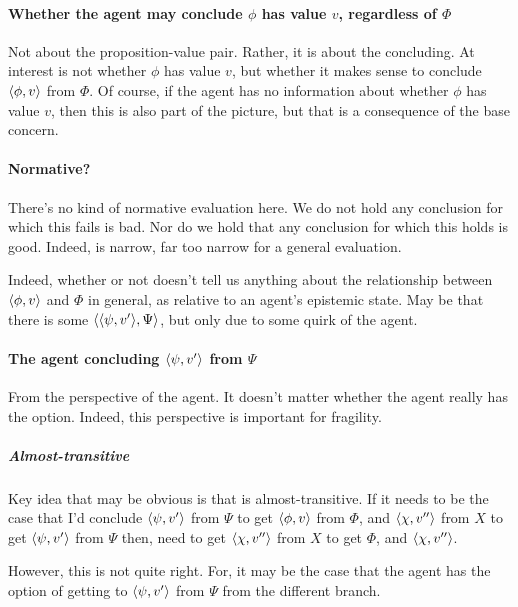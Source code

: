 \paragraph*{Whether the agent may conclude \(\phi\) has value \(v\), regardless of \(\Phi\)}

\begin{note}
  Not about the proposition-value pair.
  Rather, it is about the concluding.
  At interest is not whether \(\phi\) has value \(v\), but whether it makes sense to conclude \(\langle \phi, v \rangle\) from \(\Phi\).
  Of course, if the agent has no information about whether \(\phi\) has value \(v\), then this is also part of the picture, but that is a consequence of the base concern.
\end{note}

\paragraph*{Normative?}

\begin{note}
  There's no kind of normative evaluation here.
  We do not hold any conclusion for which this fails is bad.
  Nor do we hold that any conclusion for which this holds is good.
  Indeed, \zs{} is narrow, far too narrow for a general evaluation.

  Indeed, whether or not \zs{} doesn't tell us anything about the relationship between \(\langle \phi, v \rangle\) and \(\Phi\) in general, as relative to an agent's epistemic state.
  May be that there is some \(\langle \langle \psi, v' \rangle, \Psi \rangle\), but only due to some quirk of the agent.
\end{note}

\paragraph*{The agent concluding \(\langle \psi, v' \rangle\) from \(\Psi\)}

\begin{note}
  From the perspective of the agent.
  It doesn't matter whether the agent really has the option.
  Indeed, this perspective is important for fragility.
\end{note}

\subparagraph*{Almost-transitive}

\begin{note}
  Key idea that may be obvious is that \csN{} is almost-transitive.
  If it needs to be the case that I'd conclude \(\langle \psi, v' \rangle\) from \(\Psi\) to get \(\langle \phi, v \rangle\) from \(\Phi\), and \(\langle \chi, v'' \rangle\) from \(X\) to get \(\langle \psi, v' \rangle\) from \(\Psi\) then, need to get \(\langle \chi, v'' \rangle\) from \(X\) to get \(\Phi\), and \(\langle \chi, v'' \rangle\).

  However, this is not quite right.
  For, it may be the case that the agent has the option of getting to \(\langle \psi, v' \rangle\) from \(\Psi\) from the different branch.
\end{note}

